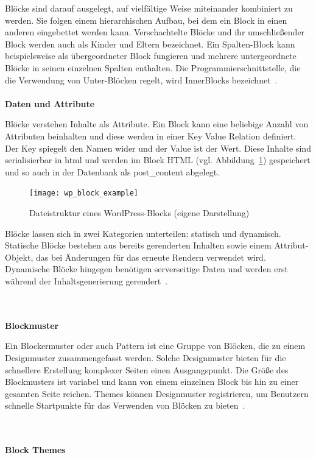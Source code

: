 Blöcke sind darauf ausgelegt, auf vielfältige Weise miteinander kombiniert zu werden.
Sie folgen einem hierarchischen Aufbau, bei dem ein Block in einen anderen eingebettet werden kann.
Verschachtelte Blöcke und ihr umschließender Block werden auch als Kinder und Eltern bezeichnet.
Ein Spalten-Block kann beispielsweise als übergeordneter Block fungieren und mehrere untergeordnete Blöcke in seinen einzelnen Spalten enthalten.
Die Programmierschnittstelle, die die Verwendung von Unter-Blöcken regelt, wird InnerBlocks bezeichnet~\cite{wordpress2024combination}.
\\\\
\textbf{Daten und Attribute}

Blöcke verstehen Inhalte als Attribute.
Ein Block kann eine beliebige Anzahl von Attributen beinhalten und diese werden in einer Key Value Relation definiert.
Der Key spiegelt den Namen wider und der Value ist der Wert.
Diese Inhalte sind serialisierbar in \gls{html} und werden im Block HTML (vgl. Abbildung~\ref{fig:wp-block-example}) gespeichert und so auch in der Datenbank als post\_content abgelegt.
\begin{figure}[H]
    \centering
    \texttt{[image: wp\_block\_example]}
    \caption{Dateistruktur eines WordPress-Blocks (eigene Darstellung)}
    \label{fig:wp-block-example}
\end{figure}

Blöcke lassen sich in zwei Kategorien unterteilen: statisch und dynamisch.
Statische Blöcke bestehen aus bereits gerenderten Inhalten sowie einem Attribut-Objekt, das bei Änderungen für das erneute Rendern verwendet wird.
Dynamische Blöcke hingegen benötigen serverseitige Daten und werden erst während der Inhaltsgenerierung gerendert~\cite{wordpress2024dataflow}.




\\\\
\textbf{Blockmuster}

Ein Blockermuster oder auch Pattern ist eine Gruppe von Blöcken, die zu einem Designmuster zusammengefasst werden.
Solche Designmuster bieten für die schnellere Erstellung komplexer Seiten einen Ausgangspunkt.
Die Größe des Blockmusters ist variabel und kann von einem einzelnen Block bis hin zu einer gesamten Seite reichen.
Themes können Designmuster registrieren, um Benutzern schnelle Startpunkte für das Verwenden von Blöcken zu bieten~\cite{wordpress2024blockpattern}.

\\\\
\textbf{Block Themes}


